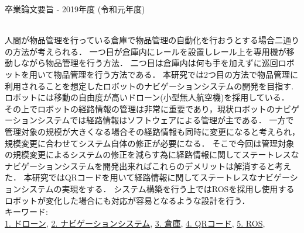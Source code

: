卒業論文要旨 - 2019年度 (令和元年度)
\begin{center}
\begin{large}
\end{large}
\end{center}
~ \\
人間が物品管理を行っている倉庫で物品管理の自動化を行おうとする場合二通りの方法が考えられる．
一つ目が倉庫内にレールを設置しレール上を専用機が移動しながら物品管理を行う方法．
二つ目は倉庫内は何も手を加えずに巡回ロボットを用いて物品管理を行う方法である．
本研究では2つ目の方法で物品管理に利用されることを想定したロボットのナビゲーションシステムの開発を目指す.
ロボットには移動の自由度が高いドローン(小型無人航空機)を採用している．
その上でロボットの経路情報の管理は非常に重要であり，現状ロボットのナビゲーションシステムでは経路情報はソフトウェアによる管理が主である．
一方で管理対象の規模が大きくなる場合その経路情報も同時に変更になると考えられ，
規模変更に合わせてシステム自体の修正が必要になる．
そこで今回は管理対象の規模変更によるシステムの修正を減らす為に経路情報に関してステートレスな
ナビゲーションシステムを開発出来ればこれらのデメリットは解消すると考えた．
本研究ではQRコードを用いて経路情報に関してステートレスなナビゲーションシステムの実現をする．
システム構築を行う上ではROSを採用し使用するロボットが変化した場合にも対応が容易となるような設計を行う．
~ \\
キーワード:\\
\underline{1. ドローン},
\underline{2. ナビゲーションシステム},
\underline{3. 倉庫},
\underline{4. QRコード},
\underline{5. ROS},
\begin{flushright}
\dept \\
\author
\end{flushright}
